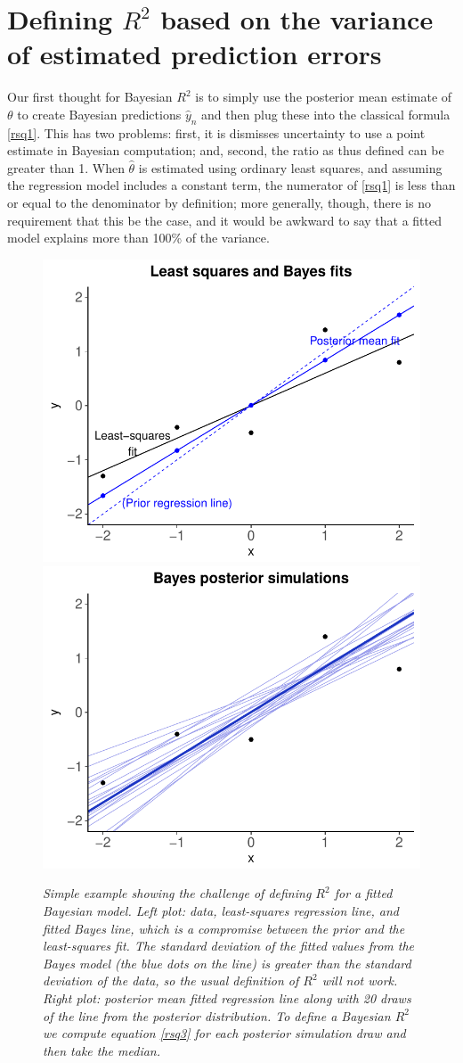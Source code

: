 \documentclass[11pt]{article}
\begin{document}
\section{Defining $R^2$ based on the variance of estimated prediction errors}

Our first thought for Bayesian $R^2$ is to simply use the posterior mean
estimate of $\theta$ to create Bayesian predictions $\hat{y}_n$ and then plug
these into the classical formula \eqref{rsq1}.  This has two problems:  first,
it is dismisses uncertainty to use a point estimate in Bayesian computation;
and, second, the ratio as thus defined can be greater than 1.  When
$\hat{\theta}$ is estimated using ordinary least squares, and assuming the
regression model includes a constant term, the numerator of \eqref{rsq1} is less
than or equal to the denominator by definition; more generally, though, there is
no requirement that this be the case, and it would be awkward to say that a
fitted model explains more than 100\% of the variance.

\begin{figure}
\centerline{\includegraphics[width=.5\textwidth]{fig/rsquared1a-gg.pdf}\includegraphics[width=.5\textwidth]{fig/rsquared1b-gg.pdf}}
\vspace{-.1in}
\caption{\em Simple example showing the challenge of defining $R^2$ for a fitted
Bayesian model.  {\em Left plot:}  data, least-squares regression line, and
fitted Bayes line, which is a compromise between the prior and the least-squares
fit.  The standard deviation of the fitted values from the Bayes model (the blue
dots on the line) is greater than the standard deviation of the data, so the
usual definition of $R^2$ will not work.  {\em Right plot:}  posterior mean
fitted regression line along with 20 draws of the line from the posterior
distribution.  To define a Bayesian $R^2$ we compute equation
\eqref{rsq3} for each posterior simulation draw and then take the median.}
\label{fig1}
\end{figure}
\end{document}

